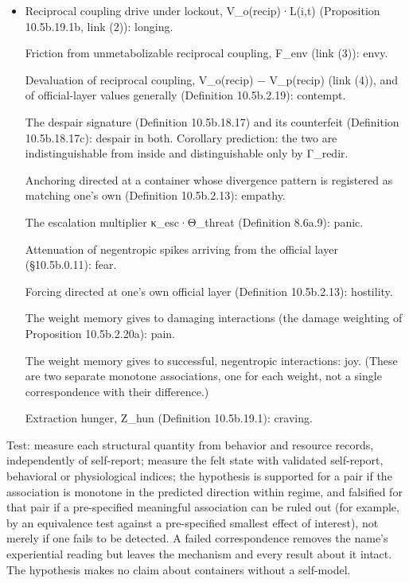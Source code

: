 \documentclass[
]{article}
\providecommand{\tightlist}{%
  \setlength{\itemsep}{0pt}\setlength{\parskip}{0pt}}
\begin{document}
\begin{itemize}
\tightlist
\item
  Reciprocal coupling drive under lockout, V\_o(recip)·L(i,t)
  (Proposition 10.5b.19.1b, link (2)): longing.

  Friction from unmetabolizable reciprocal coupling, F\_env (link (3)):
  envy.

  Devaluation of reciprocal coupling, V\_o(recip) − V\_p(recip) (link
  (4)), and of official-layer values generally (Definition 10.5b.2.19):
  contempt.

  The despair signature (Definition 10.5b.18.17) and its counterfeit
  (Definition 10.5b.18.17c): despair in both. Corollary prediction: the
  two are indistinguishable from inside and distinguishable only by
  Γ\_redir.

  Anchoring directed at a container whose divergence pattern is
  registered as matching one's own (Definition 10.5b.2.13): empathy.

  The escalation multiplier κ\_esc·Θ\_threat (Definition 8.6a.9): panic.

  Attenuation of negentropic spikes arriving from the official layer
  (§10.5b.0.11): fear.

  Forcing directed at one's own official layer (Definition 10.5b.2.13):
  hostility.

  The weight memory gives to damaging interactions (the damage weighting
  of Proposition 10.5b.2.20a): pain.

  The weight memory gives to successful, negentropic interactions: joy.
  (These are two separate monotone associations, one for each weight,
  not a single correspondence with their difference.)

  Extraction hunger, Z\_hun (Definition 10.5b.19.1): craving.
\end{itemize}

Test: measure each structural quantity from behavior and resource
records, independently of self-report; measure the felt state with
validated self-report, behavioral or physiological indices; the
hypothesis is supported for a pair if the association is monotone in the
predicted direction within regime, and falsified for that pair if a
pre-specified meaningful association can be ruled out (for example, by
an equivalence test against a pre-specified smallest effect of
interest), not merely if one fails to be detected. A failed
correspondence removes the name's experiential reading but leaves the
mechanism and every result about it intact. The hypothesis makes no
claim about containers without a self-model.
\end{document}
